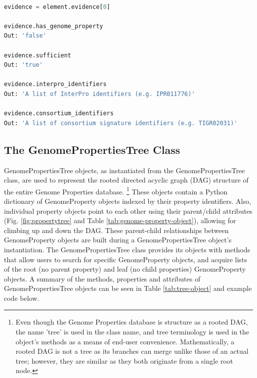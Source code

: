 \begin{lstlisting}[language=Python]

evidence = element.evidence[0]
	
evidence.has_genome_property
Out: 'false'

evidence.sufficient
Out: 'true'

evidence.interpro_identifiers
Out: 'A list of InterPro identifiers (e.g. IPR011776)'

evidence.consortium_identifiers 
Out: 'A list of consortium signature identifiers (e.g. TIGR02031)'

\end{lstlisting}

\subsection{The GenomePropertiesTree Class} \label{GenomePropertiesTree-Class}

GenomePropertiesTree objects, as instantiated from the GenomePropertiesTree class, are used to represent the rooted directed acyclic graph (DAG) structure of the entire Genome Properties database. \footnote{Even though the Genome Properties database is structure as a rooted DAG, the name 'tree' is used in the class name, and tree terminology is used in the object's methods as a means of end-user convenience. Mathematically, a rooted DAG is not a tree as its branches can merge unlike those of an actual tree; however, they are similar as they both originate from a single root node.} These objects contain a Python dictionary of GenomeProperty objects indexed by their property identifiers. Also, individual property objects point to each other using their parent/child attributes (Fig. \ref{fig:propertytree} and Table \ref{tab:genome-property-object}), allowing for climbing up and down the DAG. These parent-child relationships between GenomeProperty objects are built during a GenomePropertiesTree object's instantiation. The GenomePropertiesTree class provides its objects with methods that allow users to search for specific GenomeProperty objects, and acquire lists of the root (no parent property) and leaf (no child properties) GenomeProperty objects. A summary of the methods, properties and attributes of GenomePropertiesTree objects can be seen in Table \ref{tab:tree-object} and example code below.

